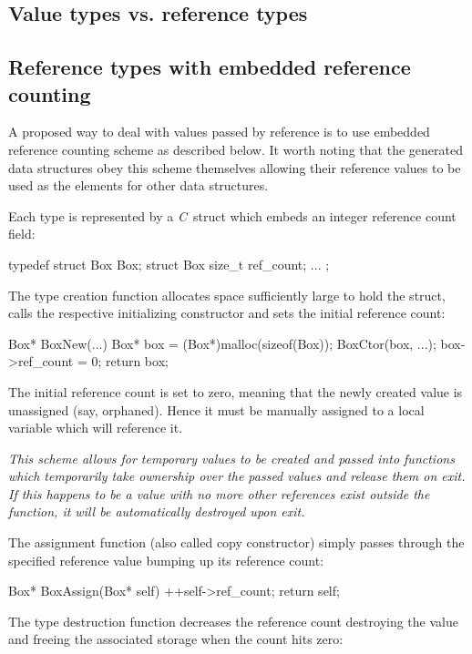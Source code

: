 \documentclass[a4paper]{article}
\newcommand{\C}{\emph{C}}
\begin{document}
\subsection{Value types vs. reference types}


\subsection{Reference types with embedded reference counting}


A proposed way to deal with values passed by reference is to use embedded reference counting scheme as described below.
It worth noting that the generated data structures obey this scheme themselves allowing their reference values to be used as the elements for other data structures.


Each type is represented by a \C\ struct which embeds an integer reference count field:


\begin{cs}
typedef struct Box Box;
struct Box {
	size_t ref_count;
	...
};
\end{cs}


The type creation function allocates space sufficiently large to hold the struct, calls the respective initializing constructor and sets the initial reference count:


\begin{cs}
Box* BoxNew(...) {
	Box* box = (Box*)malloc(sizeof(Box));
	BoxCtor(box, ...);
	box->ref_count = 0;
	return box;
}
\end{cs}


The initial reference count is set to zero, meaning that the newly created value is unassigned (say, orphaned).
Hence it must be manually assigned to a local variable which will reference it.


\emph{This scheme allows for temporary values to be created and passed into functions which temporarily take ownership over the passed values and release them on exit. If this happens to be a value with no more other references exist outside the function, it will be automatically destroyed upon exit.}


The assignment function (also called copy constructor) simply passes through the specified reference value bumping up its reference count:
\begin{cs}
Box* BoxAssign(Box* self) {
	++self->ref_count;
	return self;
}
\end{cs}


The type destruction function decreases the reference count destroying the value and freeing the associated storage when the count hits zero:
\end{document}
